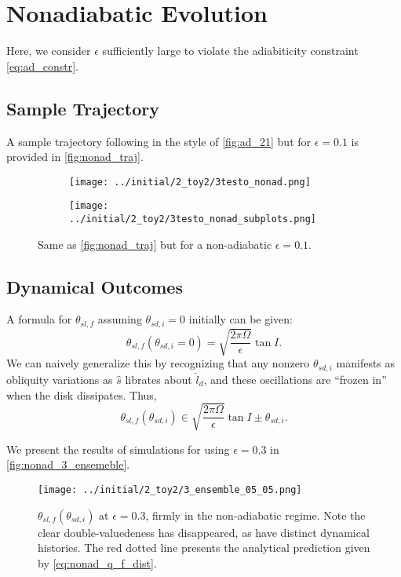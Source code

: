 \documentclass[
        fleqn,
        usenatbib,
    ]{mnras}
\newcommand*{\p}[1]{\left(#1\right)}
\begin{document}
\section{Nonadiabatic Evolution}\label{s:nonad}

Here, we consider $\epsilon$ sufficiently large to violate the adiabiticity
constraint \autoref{eq:ad_constr}.

\subsection{Sample Trajectory}

A sample trajectory following in the style of \autoref{fig:ad_21} but for
$\epsilon = 0.1$ is provided in \autoref{fig:nonad_traj}.
\begin{figure}
    \centering
    \begin{subfigure}{\columnwidth}
        \centering
        \texttt{[image: ../initial/2\_toy2/3testo\_nonad.png]}
    \end{subfigure}
    \begin{subfigure}{\columnwidth}
        \centering
        \texttt{[image: ../initial/2\_toy2/3testo\_nonad\_subplots.png]}
    \end{subfigure}
    \caption{Same as \autoref{fig:nonad_traj} but for a non-adiabatic $\epsilon =
    0.1$.}\label{fig:nonad_traj}
\end{figure}

\subsection{Dynamical Outcomes}

A formula for $\theta_{sl,f}$ assuming $\theta_{sd, i} = 0$ initially can be
given:
\begin{equation}
    \theta_{sl,f}\p{\theta_{sd, i} = 0} = \sqrt{\frac{2\pi \Omega}{\epsilon}}
        \tan I.\label{eq:nonad_q_f}
\end{equation}
We can naively generalize this by recognizing that any nonzero $\theta_{sd, i}$
manifests as obliquity variations as $\hat{s}$ librates about $\hat{l}_d$, and
these oscillations are ``frozen in'' when the disk dissipates. Thus,
\begin{equation}
    \theta_{sl,f}\p{\theta_{sd, i}} \in \sqrt{\frac{2\pi \Omega}{\epsilon}}
        \tan I \pm \theta_{sd, i}.\label{eq:nonad_q_f_dist}
\end{equation}

We present the results of simulations for using $\epsilon = 0.3$ in
\autoref{fig:nonad_3_ensemeble}.
\begin{figure}
    \centering
    \texttt{[image: ../initial/2\_toy2/3\_ensemble\_05\_05.png]}
    \caption{$\theta_{sl, f}\p{\theta_{sd, i}}$ at $\epsilon = 0.3$, firmly in
    the non-adiabatic regime. Note the clear double-valuedeness has disappeared,
    as have distinct dynamical histories. The red dotted line presents the
    analytical prediction given by
    \autoref{eq:nonad_q_f_dist}.}\label{fig:nonad_3_ensemeble}
\end{figure}
\end{document}

